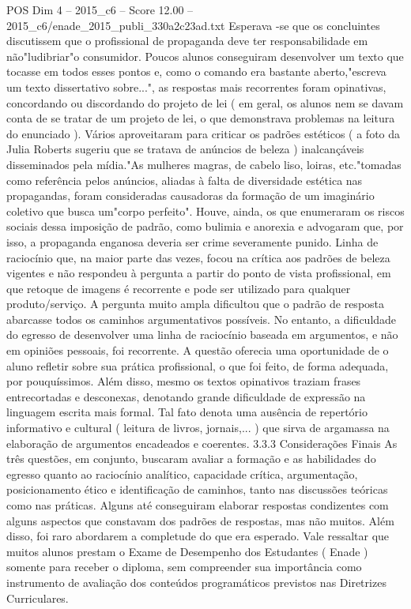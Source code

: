 \begin{textsample}{POS Dim 4 – 2015\_c6 – Score 12.00 – 2015\_c6/enade\_2015\_publi\_330a2c23ad.txt}
Esperava -se que os concluintes discutissem que o profissional de propaganda deve ter responsabilidade em não"ludibriar"o consumidor.
Poucos alunos conseguiram desenvolver um texto que tocasse em todos esses pontos e, como o comando era bastante aberto,"escreva um texto dissertativo sobre...", as respostas mais recorrentes foram opinativas, concordando ou discordando do projeto de lei ( em geral, os alunos nem se davam conta de se tratar de um projeto de lei, o que demonstrava problemas na leitura do enunciado ).
Vários aproveitaram para criticar os padrões estéticos ( a foto da Julia Roberts sugeriu que se tratava de anúncios de beleza ) inalcançáveis disseminados pela mídia."As mulheres magras, de cabelo liso, loiras, etc."tomadas como referência pelos anúncios, aliadas à falta de diversidade estética nas propagandas, foram consideradas causadoras da formação de um imaginário coletivo que busca um"corpo perfeito".
Houve, ainda, os que enumeraram os riscos sociais dessa imposição de padrão, como bulimia e anorexia e advogaram que, por isso, a propaganda enganosa deveria ser crime severamente punido.
Linha de raciocínio que, na maior parte das vezes, focou na crítica aos padrões de beleza vigentes e não respondeu à pergunta a partir do ponto de vista profissional, em que retoque de imagens é recorrente e pode ser utilizado para qualquer produto/serviço.
A pergunta muito ampla dificultou que o padrão de resposta abarcasse todos os caminhos argumentativos possíveis.
No entanto, a dificuldade do egresso de desenvolver uma linha de raciocínio baseada em argumentos, e não em opiniões pessoais, foi recorrente.
A questão oferecia uma oportunidade de o aluno refletir sobre sua prática profissional, o que foi feito, de forma adequada, por pouquíssimos.
Além disso, mesmo os textos opinativos traziam frases entrecortadas e desconexas, denotando grande dificuldade de expressão na linguagem escrita mais formal.
Tal fato denota uma ausência de repertório informativo e cultural ( leitura de livros, jornais,... ) que sirva de argamassa na elaboração de argumentos encadeados e coerentes. 3.3.3 Considerações Finais As três questões, em conjunto, buscaram avaliar a formação e as habilidades do egresso quanto ao raciocínio analítico, capacidade crítica, argumentação, posicionamento ético e identificação de caminhos, tanto nas discussões teóricas como nas práticas.
Alguns até conseguiram elaborar respostas condizentes com alguns aspectos que constavam dos padrões de respostas, mas não muitos.
Além disso, foi raro abordarem a completude do que era esperado.
Vale ressaltar que muitos alunos prestam o Exame de Desempenho dos Estudantes ( Enade ) somente para receber o diploma, sem compreender sua importância como instrumento de avaliação dos conteúdos programáticos previstos nas Diretrizes Curriculares.

\end{textsample}
